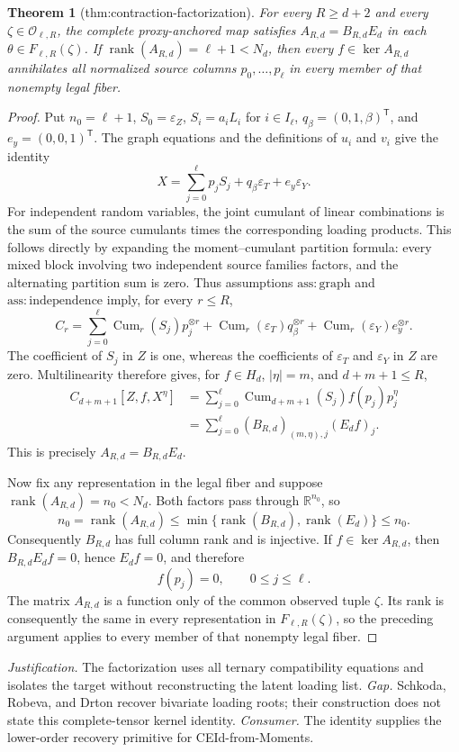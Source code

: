 \documentclass{article}
\newtheorem{theorem}{Theorem}
\begin{document}
\begin{theorem}[thm:contraction-factorization]\label{thm:contraction-factorization}
For every \(R\ge d+2\) and every \(\zeta\in\mathcal O_{\ell,R}\), the complete proxy-anchored map satisfies \(A_{R,d}=B_{R,d}E_d\) in each \(\theta\in F_{\ell,R}(\zeta)\). If \(\operatorname{rank}(A_{R,d})=\ell+1<N_d\), then every \(f\in\ker A_{R,d}\) annihilates all normalized source columns \(p_0,\ldots,p_{\ell}\) in every member of that nonempty legal fiber.
\end{theorem}
\begin{proof}
Put \(n_0=\ell+1\), \(S_0=\varepsilon_Z\), \(S_i=a_iL_i\) for \(i\in I_\ell\), \(q_\beta=(0,1,\beta)^{\mathsf T}\), and \(e_y=(0,0,1)^{\mathsf T}\).  The graph equations and the definitions of \(u_i\) and \(v_i\) give the identity
\[
 X=\sum_{j=0}^{\ell}p_jS_j+q_\beta\varepsilon_T+e_y\varepsilon_Y.
\]
For independent random variables, the joint cumulant of linear combinations is the sum of the source cumulants times the corresponding loading products.  This follows directly by expanding the moment--cumulant partition formula: every mixed block involving two independent source families factors, and the alternating partition sum is zero.  Thus assumptions \(\mathrm{ass:graph}\) and \(\mathrm{ass:independence}\) imply, for every \(r\le R\),
\[
 C_r=\sum_{j=0}^{\ell}\operatorname{Cum}_r(S_j)p_j^{\otimes r}
      +\operatorname{Cum}_r(\varepsilon_T)q_\beta^{\otimes r}
      +\operatorname{Cum}_r(\varepsilon_Y)e_y^{\otimes r}.
\]
The coefficient of \(S_j\) in \(Z\) is one, whereas the coefficients of \(\varepsilon_T\) and \(\varepsilon_Y\) in \(Z\) are zero.  Multilinearity therefore gives, for \(f\in H_d\), \(|\eta|=m\), and \(d+m+1\le R\),
\[
\begin{aligned}
 C_{d+m+1}[Z,f,X^\eta]
 &=\sum_{j=0}^{\ell}
   \operatorname{Cum}_{d+m+1}(S_j)f(p_j)p_j^\eta\\
 &=\sum_{j=0}^{\ell}(B_{R,d})_{(m,\eta),j}(E_df)_j.
\end{aligned}
\]
This is precisely \(A_{R,d}=B_{R,d}E_d\).

Now fix any representation in the legal fiber and suppose \(\operatorname{rank}(A_{R,d})=n_0<N_d\).  Both factors pass through \(\mathbb R^{n_0}\), so
\[
 n_0=\operatorname{rank}(A_{R,d})
 \le \min\{\operatorname{rank}(B_{R,d}),\operatorname{rank}(E_d)\}
 \le n_0.
\]
Consequently \(B_{R,d}\) has full column rank and is injective.  If \(f\in\ker A_{R,d}\), then \(B_{R,d}E_df=0\), hence \(E_df=0\), and therefore
\[
 f(p_j)=0,\qquad 0\le j\le\ell.
\]
The matrix \(A_{R,d}\) is a function only of the common observed tuple \(\zeta\).  Its rank is consequently the same in every representation in \(F_{\ell,R}(\zeta)\), so the preceding argument applies to every member of that nonempty legal fiber.
\end{proof}
\par\smallskip\noindent \textit{Justification.} The factorization uses all ternary compatibility equations and isolates the target without reconstructing the latent loading list. \textit{Gap.} Schkoda, Robeva, and Drton recover bivariate loading roots; their construction does not state this complete-tensor kernel identity. \textit{Consumer.} The identity supplies the lower-order recovery primitive for CEId-from-Moments.
\end{document}
